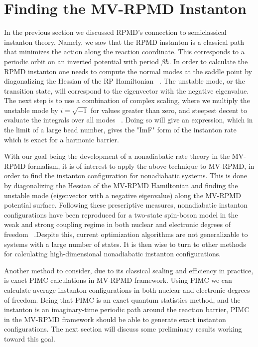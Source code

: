 \documentclass[phd,tocprelim]{cornell}
\begin{document}
   
  
  
  
 \section{Finding the MV-RPMD Instanton}
In the previous section we discussed RPMD's connection to semiclassical instanton theory. Namely, we saw that the RPMD instanton is 
a classical path that minimizes the action along the reaction coordinate. This corresponds to a periodic orbit on an inverted potential with period $\beta \hbar$. In order to calculate the RPMD instanton one needs to compute the normal modes at the saddle point by diagonalizing the Hessian of the RP Hamiltonian ~\cite{SCA2009,AFFLECK1981,CALLAN1977,IMFBOOK}. The unstable mode, or the transition state, will correspond to the eigenvector with the negative eigenvalue. The next step is to use a combination of complex scaling, where we multiply the unstable mode by $i=\sqrt{-1}$ for values greater than zero, and steepest decent to evaluate the integrals over all modes ~\cite{AFFLECK1981,CALLAN1977,IMFBOOK}. Doing so will give an expression, which in the limit of a large bead number, gives the "ImF" form of the instanton rate which is exact for a harmonic barrier. 

With our goal being the development of a nonadiabatic rate theory in the MV-RPMD formalism, it is of interest to apply the above technique to MV-RPMD, in order to find the instanton configuration for nonadiabatic systems. This is done by diagonalizing the Hessian of the MV-RPMD Hamiltonian and finding the unstable mode (eigenvector with a negative eigenvalue) along the MV-RPMD potential surface. Following these prescriptive measures, nonadiabatic instanton configurations have been reproduced for a two-state spin-boson model in the weak and strong coupling regime in both nuclear and electronic degrees of freedom ~\cite{SRINANTH18}.Despite this, current optimization algorithms are not generalizable to systems with a large number of states. It is then wise to turn to other methods for calculating high-dimensional nonadiabatic instanton configurations. 

Another method to consider, due to its classical scaling and efficiency in practice, is exact PIMC calculations in MV-RPMD framework. Using PIMC we can calculate average instanton configurations in both nuclear and electronic degrees of freedom. Being that PIMC is an exact quantum statistics method, and the instanton is an imaginary-time periodic path around the reaction barrier, PIMC in the MV-RPMD framework should be able to generate exact instanton configurations. The next section will discuss some preliminary results working toward this goal. 
\end{document}
